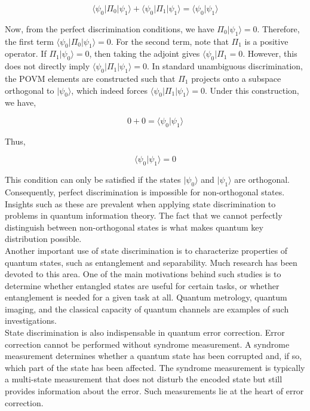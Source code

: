 \begin{equation}
    \langle\psi_0|\Pi_0|\psi_1\rangle + \langle\psi_0|\Pi_1|\psi_1\rangle = \langle\psi_0|\psi_1\rangle 
\end{equation}

Now, from the perfect discrimination conditions, we have $\Pi_0|\psi_1\rangle = 0$. Therefore, the first term $\langle\psi_0|\Pi_0|\psi_1\rangle = 0$. For the second term, note that $\Pi_1$ is a positive operator. If $\Pi_1|\psi_0\rangle = 0$, then taking the adjoint gives $\langle\psi_0|\Pi_1 = 0$. However, this does not directly imply $\langle\psi_0|\Pi_1|\psi_1\rangle = 0$. In standard unambiguous discrimination, the POVM elements are constructed such that $\Pi_1$ projects onto a subspace orthogonal to $|\psi_0\rangle$, which indeed forces $\langle\psi_0|\Pi_1|\psi_1\rangle = 0$. Under this construction, we have,

\begin{equation}
    0 + 0 = \langle\psi_0|\psi_1\rangle
\end{equation}

Thus,

\begin{equation}
    \langle\psi_0|\psi_1\rangle = 0 
\end{equation}

This condition can only be satisfied if the states $|\psi_0\rangle$ and $|\psi_1\rangle$ are orthogonal. Consequently, perfect discrimination is impossible for non-orthogonal states. Insights such as these are prevalent when applying state discrimination to problems in quantum information theory. The fact that we cannot perfectly distinguish between non-orthogonal states is what makes quantum key distribution possible.\\

Another important use of state discrimination is to characterize properties of quantum states, such as entanglement and separability. Much research has been devoted to this area. One of the main motivations behind such studies is to determine whether entangled states are useful for certain tasks, or whether entanglement is needed for a given task at all. Quantum metrology, quantum imaging, and the classical capacity of quantum channels are examples of such investigations.\\

State discrimination is also indispensable in quantum error correction. Error correction cannot be performed without syndrome measurement. A syndrome measurement determines whether a quantum state has been corrupted and, if so, which part of the state has been affected. The syndrome measurement is typically a multi-state measurement that does not disturb the encoded state but still provides information about the error. Such measurements lie at the heart of error correction.\\

